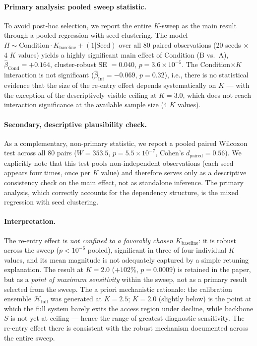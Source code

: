 \documentclass[11pt,a4paper]{article}
\theoremstyle{plain}
\theoremstyle{definition}
\theoremstyle{remark}
\begin{document}
\paragraph{Primary analysis: pooled sweep statistic.} To avoid post-hoc selection, we report the entire $K$-sweep as the main result through a pooled regression with seed clustering. The model $\Pi \sim \mathrm{Condition} \cdot K_{\mathrm{baseline}} + (1|\mathrm{Seed})$ over all 80 paired observations (20 seeds $\times$ 4 $K$ values) yields a highly significant main effect of Condition (B vs.\ A), $\hat{\beta}_{\mathrm{Cond}} = +0.164$, cluster-robust SE $= 0.040$, $p = 3.6 \times 10^{-5}$. The Condition$\times$$K$ interaction is not significant ($\hat{\beta}_{\mathrm{Int}} = -0.069$, $p = 0.32$), i.e., there is no statistical evidence that the size of the re-entry effect depends systematically on $K$ --- with the exception of the descriptively visible ceiling at $K = 3.0$, which does not reach interaction significance at the available sample size (4 $K$ values).

\paragraph{Secondary, descriptive plausibility check.} As a complementary, non-primary statistic, we report a pooled paired Wilcoxon test across all 80 pairs ($W = 353.5$, $p = 5.5 \times 10^{-7}$, Cohen's $d_\mathrm{paired} = 0.56$). We explicitly note that this test pools non-independent observations (each seed appears four times, once per $K$ value) and therefore serves only as a descriptive consistency check on the main effect, not as standalone inference. The primary analysis, which correctly accounts for the dependency structure, is the mixed regression with seed clustering.

\paragraph{Interpretation.} The re-entry effect is \emph{not confined to a favorably chosen $K_{\mathrm{baseline}}$}: it is robust across the sweep ($p < 10^{-6}$ pooled), significant in three of four individual $K$ values, and its mean magnitude is not adequately captured by a simple retuning explanation. The result at $K = 2.0$ ($+102\%$, $p = 0.0009$) is retained in the paper, but as a \emph{point of maximum sensitivity} within the sweep, not as a primary result selected from the sweep. The a priori mechanistic rationale: the calibration ensemble $\mathcal{H}_{\mathrm{full}}$ was generated at $K = 2.5$; $K = 2.0$ (slightly below) is the point at which the full system barely exits the access region under decline, while backbone $S$ is not yet at ceiling --- hence the range of greatest diagnostic sensitivity. The re-entry effect there is consistent with the robust mechanism documented across the entire sweep.
\end{document}
